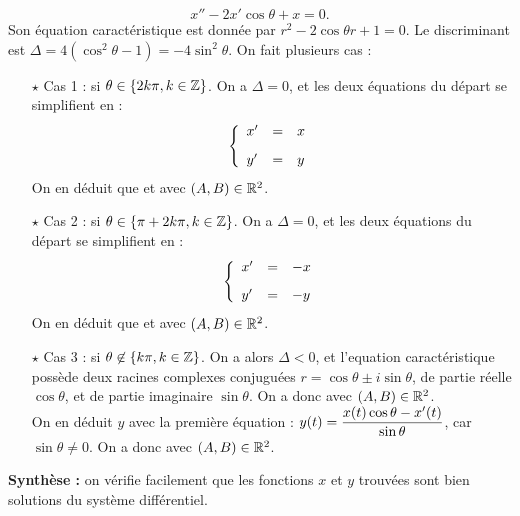 \documentclass[a4paper, 11pt,reqno]{article}
\begin{document}
\begin{correction}
\begin{enumerate}
$$x''-2x'\cos \theta + x=0.$$
Son \'equation caract\'eristique est donn\'ee par $r^2-2 \cos \theta r+1=0$. Le discriminant est $\Delta = 4(\cos^2 \theta -1) = - 4 \sin^2 \theta$. On fait plusieurs cas :
\begin{itemize}
\item[$\star$] Cas 1 : si $\theta \in \{2k \pi, k \in \mathbb{Z}\}$. On a $\Delta =0$, et les deux \'equations du d\'epart se simplifient en : 
$$\left\lbrace\begin{array}{lll} 
x^{\prime}&=& x\vsec\\
y^{\prime}&=& y  
\end{array}\right.$$
On en d\'eduit que  et  avec $(A,B) \in \mathbb{R}^2$.
\item[$\star$] Cas 2 : si $\theta \in \{\pi + 2k \pi, k \in \mathbb{Z}\}$. On a $\Delta =0$, et les deux \'equations du d\'epart se simplifient en : 
$$\left\lbrace\begin{array}{lll} 
x^{\prime}&=& -x\vsec\\
y^{\prime}&=& -y  
\end{array}\right.$$
On en d\'eduit que  et  avec $(A,B) \in \mathbb{R}^2$.
\item[$\star$]  Cas 3 : si $\theta \not \in \{k \pi, k \in \mathbb{Z}\}$. On a alors $\Delta < 0$, et l'\?equation caract\'eristique poss\`ede deux racines complexes conjugu\'ees $r= \cos \theta \pm i \sin \theta$, de partie r\'eelle $\cos \theta$, et de partie imaginaire $\sin \theta$. On a donc  avec $(A,B) \in \mathbb{R}^2$.\\
On en d\'eduit $y$ avec la premi\`ere \'equation : $y(t) = \displaystyle \frac{x(t) \cos \theta - x'(t)}{\sin \theta}$, car $\sin \theta \not=0$. On a donc  avec $(A,B) \in \mathbb{R}^2$.
\end{itemize}\vsec
\textbf{Synth\`ese :} on v\'erifie facilement que les fonctions $x$ et $y$ trouv\'ees sont bien solutions du syst\`eme diff\'erentiel.
\end{enumerate}
\end{correction}
\end{document}
